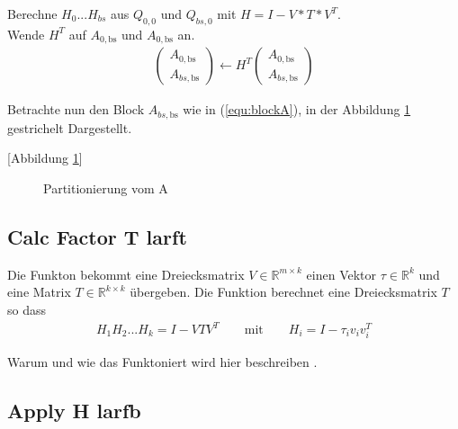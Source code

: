 Berechne $H_{0}$...$H_{bs}$ aus $Q_{0, 0}$ und $Q_{bs, 0}$ mit $H = I - V*T*V^T$.\\
Wende $H^T$ auf $A_{0, \text{bs}}$ und $ A_{0,\text{bs}}$ an.
\begin{align}
	\left(\begin{array}{l} 
	A_{0, \text{bs}} \\ \hline
	A_{bs, \text{bs}}
	\end{array}\right)
	\leftarrow
	H^T \left(\begin{array}{l} 
	A_{0, \text{bs}} \\ \hline
	A_{bs, \text{bs}}
	\end{array}\right)
\end{align}

Betrachte nun den Block $A_{bs, \text{bs}}$ wie in (\ref{equ:blockA}), in der Abbildung \ref{fig:blockA} gestrichelt Dargestellt.

[Abbildung \ref{fig:blockA}]
\begin{figure}
	\centering
	
	\caption{Partitionierung vom A}
	\label{fig:blockA}
\end{figure}

\subsection{Calc Factor T larft}

Die Funkton bekommt eine Dreiecksmatrix $V \in \mathbb{R}^{m \times k}$ einen Vektor $\tau \in \mathbb{R}^k$ und eine Matrix $T\in \mathbb{R}^{k\times k}$ übergeben. 
Die Funktion berechnet eine Dreiecksmatrix $T$ so dass
\begin{align*}
	H_1H_2...H_k = I - VTV^T \qquad \text{mit}\qquad H_i = I - \tau_i v_iv_i^T
\end{align*}

Warum und wie das Funktoniert wird hier beschreiben \cite{Joffrain:2006:AHT:1141885.1141886}.




\subsection{Apply H larfb}

